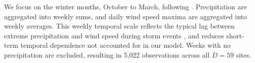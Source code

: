 \documentclass[12pt,compact]{article}
\begin{document}
We focus on the winter months, October to March, following \citet{Vignotto2021}.
Precipitation are aggregated into weekly sums, and daily wind speed maxima are aggregated into weekly averages.
This weekly temporal scale reflects the typical lag between extreme precipitation and wind speed during storm events \citep{Bengtsson2009}, and reduces short-term temporal dependence not accounted for in our model. 
Weeks with no precipitation are excluded, resulting in 5,022 observations across all $D = 59$ sites. 

\end{document}
